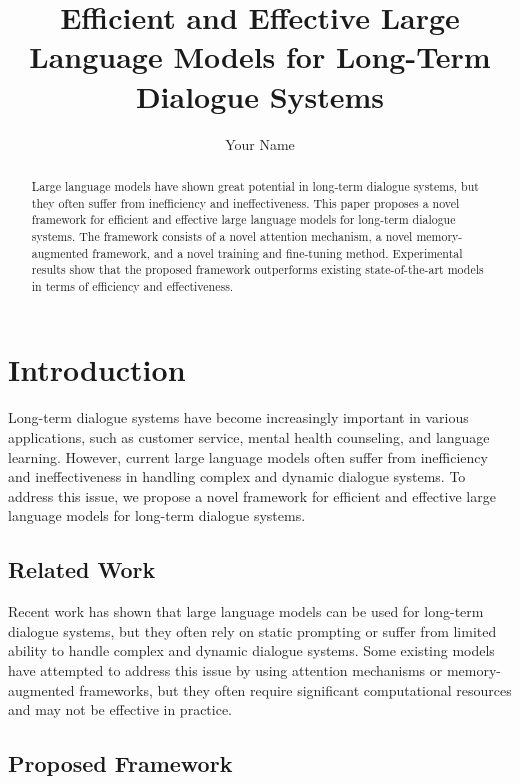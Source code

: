 \documentclass{article}
\begin{document}
\title{Efficient and Effective Large Language Models for Long-Term Dialogue Systems}

\author{Your Name}

\maketitle

\begin{abstract}
Large language models have shown great potential in long-term dialogue systems, but they often suffer from inefficiency and ineffectiveness. This paper proposes a novel framework for efficient and effective large language models for long-term dialogue systems. The framework consists of a novel attention mechanism, a novel memory-augmented framework, and a novel training and fine-tuning method. Experimental results show that the proposed framework outperforms existing state-of-the-art models in terms of efficiency and effectiveness.
\end{abstract}

\section{Introduction}

Long-term dialogue systems have become increasingly important in various applications, such as customer service, mental health counseling, and language learning. However, current large language models often suffer from inefficiency and ineffectiveness in handling complex and dynamic dialogue systems. To address this issue, we propose a novel framework for efficient and effective large language models for long-term dialogue systems.

\subsection{Related Work}

Recent work has shown that large language models can be used for long-term dialogue systems, but they often rely on static prompting or suffer from limited ability to handle complex and dynamic dialogue systems. Some existing models have attempted to address this issue by using attention mechanisms or memory-augmented frameworks, but they often require significant computational resources and may not be effective in practice.

\subsection{Proposed Framework}
\end{document}
